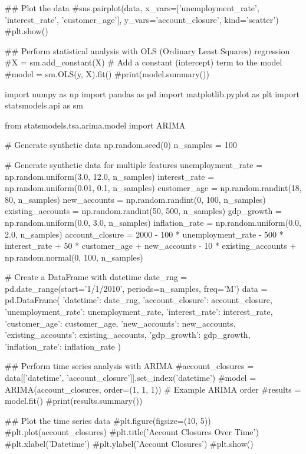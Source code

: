 ## Plot the data
#sns.pairplot(data, x_vars=['unemployment_rate', 'interest_rate', 'customer_age'], y_vars='account_closure', kind='scatter')
#plt.show()

## Perform statistical analysis with OLS (Ordinary Least Squares) regression
#X = sm.add_constant(X)  # Add a constant (intercept) term to the model
#model = sm.OLS(y, X).fit()
#print(model.summary())






import numpy as np
import pandas as pd
import matplotlib.pyplot as plt
import statsmodels.api as sm

from statsmodels.tsa.arima.model import ARIMA

# Generate synthetic data
np.random.seed(0)
n_samples = 100

# Generate synthetic data for multiple features 
unemployment_rate = np.random.uniform(3.0, 12.0, n_samples)
interest_rate = np.random.uniform(0.01, 0.1, n_samples)
customer_age = np.random.randint(18, 80, n_samples)
new_accounts = np.random.randint(0, 100, n_samples)
existing_accounts = np.random.randint(50, 500, n_samples)
gdp_growth = np.random.uniform(0.0, 3.0, n_samples)
inflation_rate = np.random.uniform(0.0, 2.0, n_samples)
account_closure = 2000 - 100 * unemployment_rate - 500 * interest_rate + 50 * customer_age + new_accounts - 10 * existing_accounts + np.random.normal(0, 100, n_samples)

# Create a DataFrame with datetime
date_rng = pd.date_range(start='1/1/2010', periods=n_samples, freq='M')
data = pd.DataFrame({
    'datetime': date_rng,
    'account_closure': account_closure,
    'unemployment_rate': unemployment_rate,
    'interest_rate': interest_rate,
    'customer_age': customer_age,
    'new_accounts': new_accounts,
    'existing_accounts': existing_accounts,
    'gdp_growth': gdp_growth,
    'inflation_rate': inflation_rate
})

## Perform time series analysis with ARIMA
#account_closures = data[['datetime', 'account_closure']].set_index('datetime')
#model = ARIMA(account_closures, order=(1, 1, 1))  # Example ARIMA order
#results = model.fit()
#print(results.summary())

## Plot the time series data
#plt.figure(figsize=(10, 5))
#plt.plot(account_closures)
#plt.title('Account Closures Over Time')
#plt.xlabel('Datetime')
#plt.ylabel('Account Closures')
#plt.show()






